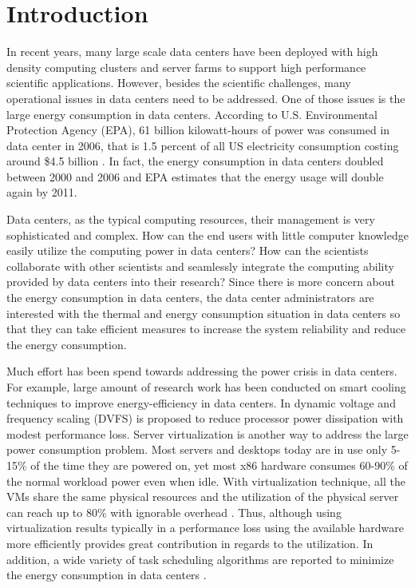 \section{Introduction}

In recent years, many large scale data centers have been deployed with high density computing clusters and server farms to support high performance scientific applications. However, besides the scientific challenges, many operational issues in data centers need to be addressed. One of those issues is the large energy consumption in data centers. According to U.S. Environmental Protection Agency (EPA), 61 billion kilowatt-hours of power was consumed in data center in 2006, that is 1.5 percent of all US electricity consumption costing around \$4.5 billion \cite{www-epa}. In fact, the energy consumption in data centers doubled between 2000 and 2006 and EPA estimates that the energy usage will double again by 2011. 

Data centers, as the typical computing resources, their management is very sophisticated and complex. How can the end users with little computer knowledge easily utilize the computing power in data centers? How can the scientists collaborate with other scientists and seamlessly integrate the computing ability provided by data centers into their research? Since there is more concern about the energy consumption in data centers, the data center administrators are interested with the thermal and energy consumption situation in data centers so that they can take efficient measures to increase the system reliability and reduce the energy consumption.      

Much effort has been spend towards addressing the power crisis in data centers. For example, large amount of research work has been conducted on smart cooling techniques \cite{patel2002tcc, beitelmal2007tfp, moore2005dcw, moore2006wao}  to improve energy-efficiency in data centers. In \cite{hsu2005fap,DBLP:conf/sc/HsuF05} dynamic voltage and frequency scaling (DVFS) is proposed to reduce processor power dissipation with modest performance loss. Server virtualization \cite{DBLP:conf/sosp/BarhamDFHHHN03} is another way to address the large power consumption problem. Most servers and desktops today are in use only 5-15\% of the time they are powered on, yet most x86 hardware consumes 60-90\% of the normal workload power even when idle. With virtualization technique, all the VMs share the same physical resources and the utilization of the physical server can reach up to 80\% with ignorable overhead \cite{DBLP:conf/nca/SilvaASTA07}. Thus, although using virtualization results typically in a performance loss using the available hardware more efficiently provides great contribution in regards to the utilization. In addition, a wide variety of task scheduling algorithms are reported to minimize the energy consumption in data centers \cite{DBLP:conf/ccgrid/KimBK07,DBLP:conf/sc/GeFC05,DBLP:conf/cluster/TangGV07,DBLP:conf/usenix/MooreCRS05,DBLP:conf/aPcsac/VandersterBD07}. 

